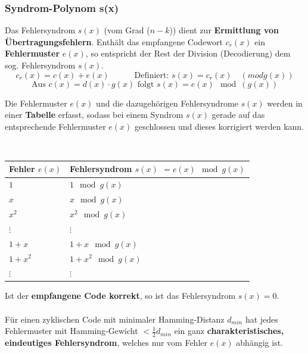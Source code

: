 \subsubsection{Syndrom-Polynom s(x) }
\begin{minipage}{13.1cm}
Das Fehlersyndrom $s(x)$ (vom Grad ($n-k$)) dient zur \textbf{Ermittlung von Übertragungsfehlern}.
Enthält das empfangene Codewort $c_r(x)$ ein \textbf{Fehlermuster} $e(x)$, so entspricht der
Rest der Division (Decodierung) dem sog. Fehlersyndrom $s(x)$.
$$ c_r(x) = c(x) + e(x) \quad \qquad \text{Definiert: }s(x) = c_r(x) \quad (mod g(x)) $$
$$ \text{Aus } c(x) = d(x)\cdot g(x) \text{ folgt } \boxed{s(x) = e(x) \mod{(g(x))}}$$

	Die Fehlermuster $e(x)$ und die dazugehörigen Fehlersyndrome $s(x)$ werden in einer
\textbf{Tabelle} erfasst, sodass bei einem Syndrom $s(x)$ gerade auf das entsprechende Fehlermuster $e(x)$
geschlossen und dieses korrigiert werden kann.
\end{minipage} 
\begin{minipage}{0.3cm}
$\quad$
\end{minipage}
\begin{minipage}{7cm}
	\begin{tabular}{| p{1.8cm} | p{2.8cm} |}
  		\hline
  			Fehler $e(x)$ & Fehlersyndrom $s(x)$ $= e(x)  \mod{g(x)} $ \\
  		\hline
  			$1$	&	$1 \mod{g(x)}$ \\
  			$x$	&	$x \mod{g(x)}$ \\
  			$x^2$	&	$x^2 \mod{g(x)}$ \\
  			$\vdots$ & $\vdots$ \\
  			$1 + x$ &	$1+x \mod{g(x)}$ \\
  			$1 + x^2$ &	$1+x^2 \mod{g(x)}$ \\
  			$\vdots$ & $\vdots$  	\\		
  		\hline
  	\end{tabular}
\end{minipage}

Ist der \textbf{empfangene Code korrekt}, so ist das Fehlersyndrom \boldmath$s(x) =
0$\unboldmath.\\ \\
Für einen zyklischen Code mit minimaler Hamming-Distanz $d_{min}$ hat jedes
Fehlermuster mit Hamming-Gewicht $< \frac12 d_{min}$ ein ganz \textbf{charakteristisches, eindeutiges Fehlersyndrom}, welches nur vom Fehler $e(x)$
abhängig ist.

